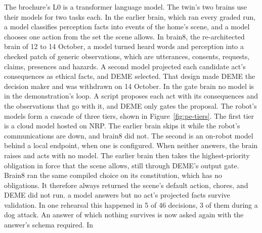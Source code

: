 The brochure's L0 is a transformer language model.
The twin's two brains use their models for two tasks each. In the earlier brain, which ran every
graded run, a model classifies perception facts into events of the home's scene, and a model
chooses one action from the set the scene allows.
In brain8, the re-architected brain of 12 to 14 October, a model turned heard words and perception
into a checked patch of generic observations, which are utterances, consents, requests, claims,
presences and hazards. A second model projected each candidate act's consequences as ethical facts,
and DEME selected. That design made DEME the decision maker and was withdrawn on 14 October. In the
gate brain no model is in the demonstration's loop. A script proposes each act with its
consequences and the observations that go with it, and DEME only gates the proposal.
The robot's models form a cascade of three tiers, shown in Figure~\ref{fig:pe-tiers}.
The first tier is a cloud model hosted on NRP. The earlier brain skips it while the robot's
communications are down, and brain8 did not.
The second is an on-robot model behind a local endpoint, when one is configured. When neither
answers, the brain raises  and acts with no model. The earlier brain then
takes the highest-priority obligation in force that the scene allows, still through DEME's output
gate.
Brain8 ran the same compiled choice on its constitution, which has no obligations. It therefore
always returned the scene's default action, chores, and DEME did not run.
a model answers but no act's projected facts survive validation. In one rehearsal this happened in
5 of 46 decisions, 3 of them during a dog attack.
An answer of which nothing survives is now asked again with the answer's schema required. In
